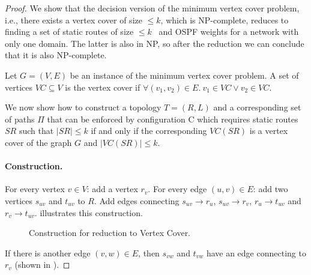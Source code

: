 \begin{proof}
We show that the decision version of the minimum 
vertex cover problem, i.e., there exists a vertex cover
of size $ \leq k$, which is NP-complete, 
reduces to finding a set of static routes 
of size $ \leq k$ \
and OSPF weights for a network with only one domain. 
The latter is also in NP, so after the reduction we 
can conclude that it is also NP-complete.

Let $G = (V,E)$ be an instance of the 
minimum vertex cover problem. A set of
vertices $VC \subseteq V$ is the vertex cover
if $\forall (v_1, v_2) \in E. ~v_1 \in VC \vee v_2 \in VC$. 

We now show how to construct a topology $T=(R,L)$ 
and a corresponding set of paths $\Pi$ that can be enforced 
by configuration C which requires static routes $SR$ such that $|SR| \leq k$  
if and only if the corresponding $VC(SR)$ is a vertex cover of 
the graph $G$ and $|VC(SR)| \leq k$.

\paragraph{Construction.}
For every vertex $v \in V$: add a vertex $r_v$.
For every edge $(u,v) \in E$: add two vertices $s_{uv}$
and $t_{uv}$ to $R$. Add edges
connecting $s_{uv} \rightarrow r_{u}$, $s_{uv} \rightarrow r_{v}$,
$r_{u} \rightarrow t_{uv}$ and $r_{v} \rightarrow t_{uv}$. 
 illustrates this construction.
\begin{figure}[H]
	\centering
	\caption{Construction for reduction to Vertex Cover.}
	\label{fig:rfcomplexity}
\end{figure}
If there is another edge $(v,w) \in E$, then
$s_{vw}$ and $t_{vw}$ have an edge connecting to $r_v$ (shown
in ). 


\end{proof}
